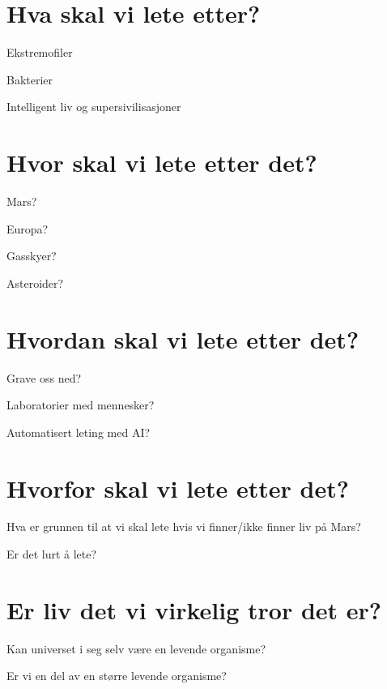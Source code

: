 \section*{Hva skal vi lete etter?}
Ekstremofiler

Bakterier

Intelligent liv og supersivilisasjoner

\section*{Hvor skal vi lete etter det?}
Mars?

Europa?

Gasskyer?

Asteroider?

\section*{Hvordan skal vi lete etter det?}
Grave oss ned?

Laboratorier med mennesker?

Automatisert leting med AI?

\section*{Hvorfor skal vi lete etter det?}
Hva er grunnen til at vi skal lete hvis vi finner/ikke finner liv på Mars?

Er det lurt å lete?

\section*{Er liv det vi virkelig tror det er?}
Kan universet i seg selv være en levende organisme?

Er vi en del av en større levende organisme?